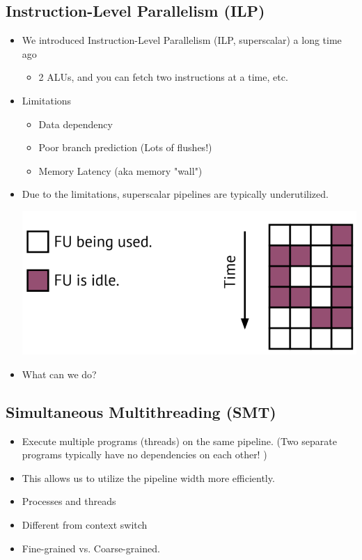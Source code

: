 \documentclass[10pt]{article}
\begin{document}
\subsection*{Instruction-Level Parallelism (ILP)}
\begin{itemize}
    \item We introduced Instruction-Level Parallelism (ILP, superscalar) a long time ago
    \begin{itemize}
        \item 2 ALUs, and you can fetch two instructions at a time, etc.
    \end{itemize}
    \item Limitations
    \begin{itemize}
        \item Data dependency
        \item Poor branch prediction (Lots of flushes!)
        \item Memory Latency (aka memory "wall")
    \end{itemize}
    \item Due to the limitations, superscalar pipelines are typically underutilized.
    \begin{center}
        \includegraphics*[scale=0.6]{W8_1.png}
    \end{center}
    \item What can we do?
\end{itemize}

\subsection*{Simultaneous Multithreading (SMT)}
\begin{itemize}
    \item Execute multiple programs (threads) on the same pipeline.  (Two separate programs typically have no dependencies on each other! )
    \item This allows us to utilize the pipeline width more efficiently.
    \item Processes and threads
    \item Different from context switch
    \item Fine-grained vs. Coarse-grained.
\end{itemize}
\end{document}
